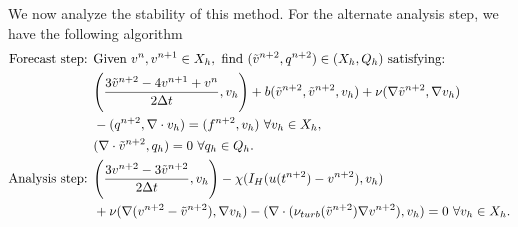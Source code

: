 \documentclass[11pt,a4paper]{article}
\begin{document}
We now analyze the stability of this method. For the alternate analysis step, we have the following algorithm
    \begin{align}
    \text{Forecast step: } 
    &\text{Given } v^n, v^{n+1} \in X_h, \text{ find } (\Tilde{v}^{n+2}, q^{n+2}) \in (X_h, Q_h) \text{ satisfying:} \notag \\ 
    &\Bigg(\frac{3\Tilde{v}^{n+2}-4v^{n+1}+v^n}{2\Delta t}, v_h\Bigg)+b(\Tilde{v}^{n+2}, \Tilde{v}^{n+2}, v_h) + \nu (\nabla \Tilde{v}^{n+2}, \nabla v_h) \\
    &- (q^{n+2}, \nabla \cdot v_h)=(f^{n+2},v_h) \text{ } \forall v_h \in X_h, \notag \\ 
    &(\nabla \cdot \Tilde{v}^{n+2}, q_h) = 0 \text{ } \forall q_h \in Q_h.\\
    \text{Analysis step: }
    &\Bigg(\frac{3v^{n+2}-3\Tilde{v}^{n+2}}{2\Delta t}, v_h\Bigg) -\chi (I_H(u(t^{n+2})-v^{n+2}), v_h) \notag \\
    &+ \nu (\nabla (v^{n+2}-\Tilde{v}^{n+2}),\nabla v_h) - (\nabla \cdot (\nu_{turb}(\Tilde{v}^{n+2})\nabla v^{n+2}), v_h)=0 \text{ } \forall v_h \in X_h.
    \end{align}
\end{document}
